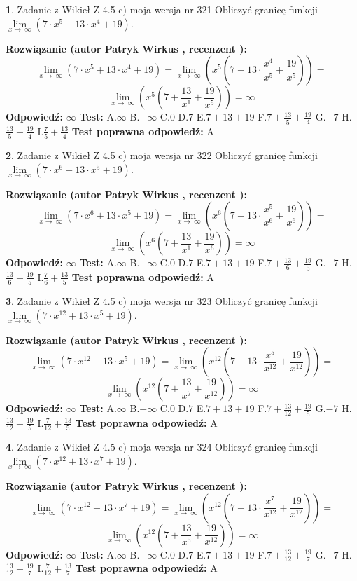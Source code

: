 \documentclass[12pt, a4paper]{article}
\theoremstyle{definition} %
\newtheorem{zad}{}
\newcommand{\zadStart}[1]{\begin{zad}#1\newline}
\newcommand{\zadStop}{\end{zad}}
\newcommand{\rozwStart}[2]{\noindent \textbf{Rozwiązanie (autor #1 , recenzent #2): }\newline}
\newcommand{\rozwStop}{\newline}
\newcommand{\odpStart}{\noindent \textbf{Odpowiedź:}\newline}
\newcommand{\odpStop}{\newline}
\newcommand{\testStart}{\noindent \textbf{Test:}\newline}
\newcommand{\testStop}{\newline}
\newcommand{\kluczStart}{\noindent \textbf{Test poprawna odpowiedź:}\newline}
\newcommand{\kluczStop}{\newline}
\begin{document}
\zadStart{Zadanie z Wikieł Z 4.5 c) moja wersja nr 321}
Obliczyć granicę funkcji  $\lim\limits_{x\to\ \infty}(7 \cdot x^{5}+13 \cdot x^{4}+19)$.
\zadStop
\rozwStart{Patryk Wirkus}{}
$$\lim\limits_{x\to\ \infty}(7 \cdot x^{5}+13 \cdot x^{4}+19) = \lim\limits_{x\to\ \infty}(x^{5}(7 +13 \cdot \frac{x^{4}}{x^{5}}+\frac{19}{x^{5}})) =$$ $$\lim\limits_{x\to\ \infty}(x^{5}(7 +\frac{13}{x^{1}}+\frac{19}{x^{5}})) =\infty$$
\rozwStop
\odpStart
$\infty$
\odpStop
\testStart
A.$\infty$ B.$-\infty$ C.$0$ D.$7$ E.$7 + 13 + 19$
F.$7+\frac{13}{5}+\frac{19}{4}$ G.$-7$
H.$\frac{13}{5}+\frac{19}{4}$
I.$\frac{7}{5}+\frac{13}{4}$
\testStop
\kluczStart
A
\kluczStop



\zadStart{Zadanie z Wikieł Z 4.5 c) moja wersja nr 322}
Obliczyć granicę funkcji  $\lim\limits_{x\to\ \infty}(7 \cdot x^{6}+13 \cdot x^{5}+19)$.
\zadStop
\rozwStart{Patryk Wirkus}{}
$$\lim\limits_{x\to\ \infty}(7 \cdot x^{6}+13 \cdot x^{5}+19) = \lim\limits_{x\to\ \infty}(x^{6}(7 +13 \cdot \frac{x^{5}}{x^{6}}+\frac{19}{x^{6}})) =$$ $$\lim\limits_{x\to\ \infty}(x^{6}(7 +\frac{13}{x^{1}}+\frac{19}{x^{6}})) =\infty$$
\rozwStop
\odpStart
$\infty$
\odpStop
\testStart
A.$\infty$ B.$-\infty$ C.$0$ D.$7$ E.$7 + 13 + 19$
F.$7+\frac{13}{6}+\frac{19}{5}$ G.$-7$
H.$\frac{13}{6}+\frac{19}{5}$
I.$\frac{7}{6}+\frac{13}{5}$
\testStop
\kluczStart
A
\kluczStop



\zadStart{Zadanie z Wikieł Z 4.5 c) moja wersja nr 323}
Obliczyć granicę funkcji  $\lim\limits_{x\to\ \infty}(7 \cdot x^{12}+13 \cdot x^{5}+19)$.
\zadStop
\rozwStart{Patryk Wirkus}{}
$$\lim\limits_{x\to\ \infty}(7 \cdot x^{12}+13 \cdot x^{5}+19) = \lim\limits_{x\to\ \infty}(x^{12}(7 +13 \cdot \frac{x^{5}}{x^{12}}+\frac{19}{x^{12}})) =$$ $$\lim\limits_{x\to\ \infty}(x^{12}(7 +\frac{13}{x^{7}}+\frac{19}{x^{12}})) =\infty$$
\rozwStop
\odpStart
$\infty$
\odpStop
\testStart
A.$\infty$ B.$-\infty$ C.$0$ D.$7$ E.$7 + 13 + 19$
F.$7+\frac{13}{12}+\frac{19}{5}$ G.$-7$
H.$\frac{13}{12}+\frac{19}{5}$
I.$\frac{7}{12}+\frac{13}{5}$
\testStop
\kluczStart
A
\kluczStop



\zadStart{Zadanie z Wikieł Z 4.5 c) moja wersja nr 324}
Obliczyć granicę funkcji  $\lim\limits_{x\to\ \infty}(7 \cdot x^{12}+13 \cdot x^{7}+19)$.
\zadStop
\rozwStart{Patryk Wirkus}{}
$$\lim\limits_{x\to\ \infty}(7 \cdot x^{12}+13 \cdot x^{7}+19) = \lim\limits_{x\to\ \infty}(x^{12}(7 +13 \cdot \frac{x^{7}}{x^{12}}+\frac{19}{x^{12}})) =$$ $$\lim\limits_{x\to\ \infty}(x^{12}(7 +\frac{13}{x^{5}}+\frac{19}{x^{12}})) =\infty$$
\rozwStop
\odpStart
$\infty$
\odpStop
\testStart
A.$\infty$ B.$-\infty$ C.$0$ D.$7$ E.$7 + 13 + 19$
F.$7+\frac{13}{12}+\frac{19}{7}$ G.$-7$
H.$\frac{13}{12}+\frac{19}{7}$
I.$\frac{7}{12}+\frac{13}{7}$
\testStop
\kluczStart
A
\kluczStop
\end{document}

